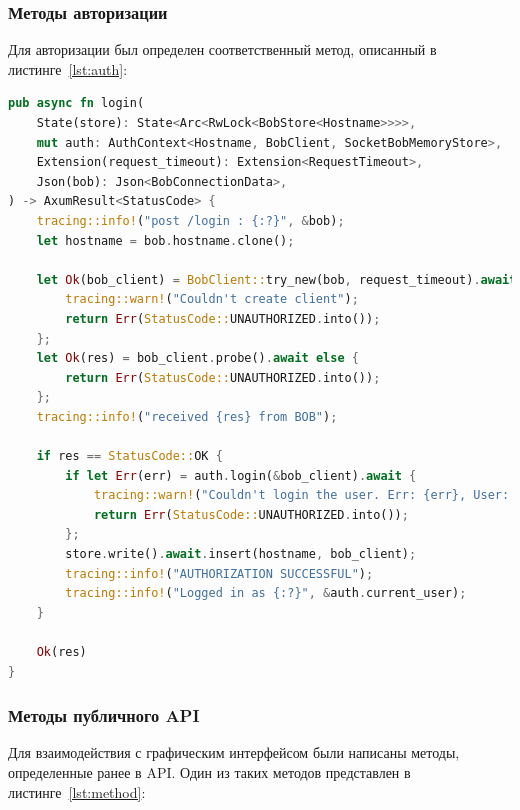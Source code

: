 \subsubsection{Методы авторизации}
Для авторизации был определен соответственный метод, описанный в листинге~\ref{lst:auth}:

\begin{lstlisting}[label=lst:auth, caption={Метод Авторизации}, language=Rust]
pub async fn login(
    State(store): State<Arc<RwLock<BobStore<Hostname>>>>,
    mut auth: AuthContext<Hostname, BobClient, SocketBobMemoryStore>,
    Extension(request_timeout): Extension<RequestTimeout>,
    Json(bob): Json<BobConnectionData>,
) -> AxumResult<StatusCode> {
    tracing::info!("post /login : {:?}", &bob);
    let hostname = bob.hostname.clone();

    let Ok(bob_client) = BobClient::try_new(bob, request_timeout).await else {
        tracing::warn!("Couldn't create client");
        return Err(StatusCode::UNAUTHORIZED.into());
    };
    let Ok(res) = bob_client.probe().await else {
        return Err(StatusCode::UNAUTHORIZED.into());
    };
    tracing::info!("received {res} from BOB");

    if res == StatusCode::OK {
        if let Err(err) = auth.login(&bob_client).await {
            tracing::warn!("Couldn't login the user. Err: {err}, User: {bob_client:?}");
            return Err(StatusCode::UNAUTHORIZED.into());
        };
        store.write().await.insert(hostname, bob_client);
        tracing::info!("AUTHORIZATION SUCCESSFUL");
        tracing::info!("Logged in as {:?}", &auth.current_user);
    }

    Ok(res)
}
\end{lstlisting}

\subsubsection{Методы публичного API}

Для взаимодействия с графическим интерфейсом были написаны методы, определенные ранее в API. Один из таких методов представлен в листинге~\ref{lst:method}:

